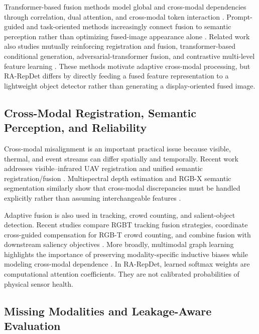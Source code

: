 Transformer-based fusion methods model global and cross-modal dependencies through correlation, dual attention, and cross-modal token interaction \cite{Tang2023TCCFusion,Tang2023DATFuse,Park2024CrossModalTransformers}. Prompt-guided and task-oriented methods increasingly connect fusion to semantic perception rather than optimizing fused-image appearance alone \cite{Liu2023PromptFusion,Tang2023PSFusion}. Related work also studies mutually reinforcing registration and fusion, transformer-based conditional generation, adversarial-transformer fusion, and contrastive multi-level feature learning \cite{Xu2023MURF,Zhang2023ConditionalGANFusion,Rao2023TGFuse,Liu2023CoCoNet}. These methods motivate adaptive cross-modal processing, but RA-RepDet differs by directly feeding a fused feature representation to a lightweight object detector rather than generating a display-oriented fused image.

\subsection{Cross-Modal Registration, Semantic Perception, and Reliability}

Cross-modal misalignment is an important practical issue because visible, thermal, and event streams can differ spatially and temporally. Recent work addresses visible--infrared UAV registration and unified semantic registration/fusion \cite{Luo2023UAVRegistration,Xie2023SemanticsLeadAll}. Multispectral depth estimation and RGB-X semantic segmentation similarly show that cross-modal discrepancies must be handled explicitly rather than assuming interchangeable features \cite{Guo2023MultiSpectrumDepth,Zhang2023CMX,Zhao2023ModalityDiscrepancies}.

Adaptive fusion is also used in tracking, crowd counting, and salient-object detection. Recent studies compare RGBT tracking fusion strategies, coordinate cross-guided compensation for RGB-T crowd counting, and combine fusion with downstream saliency objectives \cite{Tang2023RGBTTracking,Zhou2023MC3Net,Yang2024CAGNet,Wang2023FusionSOD}. More broadly, multimodal graph learning highlights the importance of preserving modality-specific inductive biases while modeling cross-modal dependence \cite{Ektefaie2023MultimodalGraphs}. In RA-RepDet, learned softmax weights are computational attention coefficients. They are not calibrated probabilities of physical sensor health.

\subsection{Missing Modalities and Leakage-Aware Evaluation}

